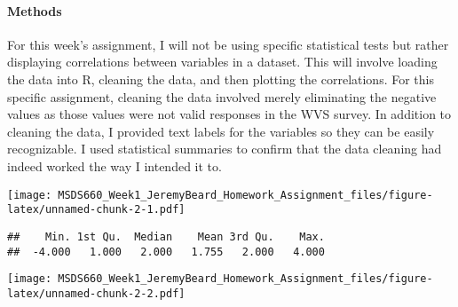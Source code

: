 \documentclass[
]{article}
\newenvironment{Shaded}{\begin{snugshade}}{\end{snugshade}}
\newcommand{\AlertTok}[1]{\textcolor[rgb]{0.94,0.16,0.16}{#1}}
\newcommand{\CommentTok}[1]{\textcolor[rgb]{0.56,0.35,0.01}{\textit{#1}}}
\newcommand{\DocumentationTok}[1]{\textcolor[rgb]{0.56,0.35,0.01}{\textbf{\textit{#1}}}}
\newcommand{\FunctionTok}[1]{\textcolor[rgb]{0.00,0.00,0.00}{#1}}
\newcommand{\NormalTok}[1]{#1}
\newcommand{\SpecialCharTok}[1]{\textcolor[rgb]{0.00,0.00,0.00}{#1}}
\begin{document}
\hypertarget{methods}{%
\paragraph{Methods}\label{methods}}

For this week's assignment, I will not be using specific statistical
tests but rather displaying correlations between variables in a dataset.
This will involve loading the data into R, cleaning the data, and then
plotting the correlations. For this specific assignment, cleaning the
data involved merely eliminating the negative values as those values
were not valid responses in the WVS survey. In addition to cleaning the
data, I provided text labels for the variables so they can be easily
recognizable. I used statistical summaries to confirm that the data
cleaning had indeed worked the way I intended it to.

\begin{Shaded}
\end{Shaded}

\texttt{[image: MSDS660\_Week1\_JeremyBeard\_Homework\_Assignment\_files/figure-latex/unnamed-chunk-2-1.pdf]}

\begin{Shaded}
\end{Shaded}

\begin{verbatim}
##    Min. 1st Qu.  Median    Mean 3rd Qu.    Max. 
##  -4.000   1.000   2.000   1.755   2.000   4.000
\end{verbatim}

\begin{Shaded}
\end{Shaded}

\texttt{[image: MSDS660\_Week1\_JeremyBeard\_Homework\_Assignment\_files/figure-latex/unnamed-chunk-2-2.pdf]}
\end{document}
